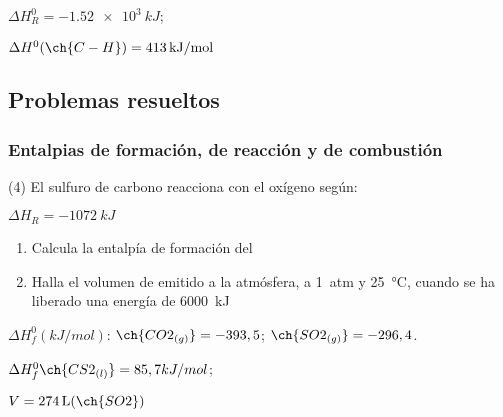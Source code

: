 \documentclass[10pt]{article}
\newenvironment{gexdatos}{
  \noindent\makebox[0pt][r]{\textit{Datos:}}
  }{\vspace{5pt}}
\begin{document}
\begin{multicols}{2}
\begin{solution}
  \begin{enumerate*}
    \item \( \Delta H^0_R = \SI{-1.52e3}{kJ} \); \item \( \Delta H^0 (\ch{C-H}) = \SI{413}{kJ/mol} \)
  \end{enumerate*}
\end{solution}




\subsection{Problemas resueltos}

\subsubsection{Entalpias de formación, de reacción y de combustión}





\begin{exercise}[
    tags    = {},
    topics  = {química,química básica},
    source  = {FQ 1B MGH 2016, p85, e26},
  ]

  (4) El sulfuro de carbono reacciona con el oxígeno según:

   \( \Delta H_R = \SI{-1072}{kJ} \)

  \begin{enumerate}
    \item Calcula la entalpía de formación del 
    \item Halla el volumen de  emitido a la atmósfera, a \SI{1}{atm} y \SI{25}{\celsius}, cuando se ha liberado una energía de \SI{6000}{kJ}
  \end{enumerate}

  \begin{gexdatos}
    \( \Delta H^0_f (\si{kJ/mol}) \): \( \ch{CO2_{(g)}} = -393,5 \); \( \ch{SO2_{(g)}} = -296,4 \).
  \end{gexdatos}

\end{exercise}

\begin{solution}
  \begin{enumerate*}
    \item \( \Delta H^0_f \ch{CS2_{(l)}} = 85,7 kJ/mol \); \item \( V = \SI{274}{\liter} (\ch{SO2}) \)
  \end{enumerate*}
\end{solution}






\end{multicols}
\end{document}
